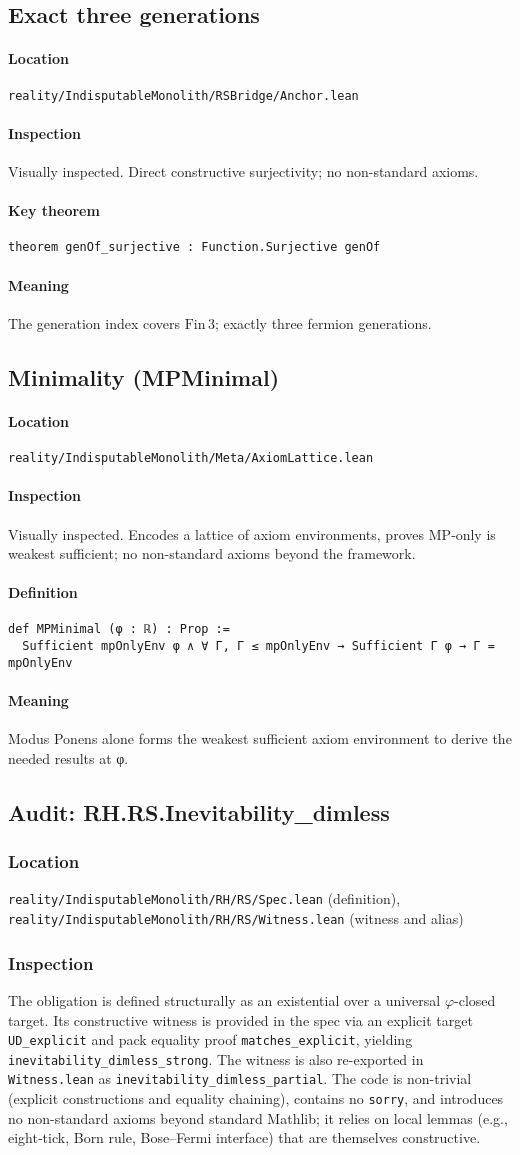 \documentclass{article}
\newcommand{\FileRef}[1]{\texttt{#1}}
\newcommand{\ModuleHeader}[3]{%
  \subsection{#1}
  \paragraph{Location} \FileRef{#2}\\
  \paragraph{Inspection} #3
}
\begin{document}
\ModuleHeader{Exact three generations}{reality/IndisputableMonolith/RSBridge/Anchor.lean}{Visually inspected. Direct constructive surjectivity; no non-standard axioms.}
\paragraph{Key theorem}
\begin{lstlisting}
theorem genOf_surjective : Function.Surjective genOf
\end{lstlisting}
\paragraph{Meaning} The generation index covers \(\mathrm{Fin}\,3\); exactly three fermion generations.

\ModuleHeader{Minimality (MPMinimal)}{reality/IndisputableMonolith/Meta/AxiomLattice.lean}{Visually inspected. Encodes a lattice of axiom environments, proves MP‑only is weakest sufficient; no non-standard axioms beyond the framework.}
\paragraph{Definition}
\begin{lstlisting}
def MPMinimal (φ : ℝ) : Prop :=
  Sufficient mpOnlyEnv φ ∧ ∀ Γ, Γ ≤ mpOnlyEnv → Sufficient Γ φ → Γ = mpOnlyEnv
\end{lstlisting}
\paragraph{Meaning} Modus Ponens alone forms the weakest sufficient axiom environment to derive the needed results at φ.


\subsection{Audit: RH.RS.Inevitability\_dimless}
\subsubsection{Location}
\FileRef{reality/IndisputableMonolith/RH/RS/Spec.lean} (definition),\\
\FileRef{reality/IndisputableMonolith/RH/RS/Witness.lean} (witness and alias)

\subsubsection{Inspection}
The obligation is defined structurally as an existential over a universal \(\varphi\)-closed target. Its constructive witness is provided in the spec via an explicit target \texttt{UD\_explicit} and pack equality proof \texttt{matches\_explicit}, yielding \texttt{inevitability\_dimless\_strong}. The witness is also re-exported in \texttt{Witness.lean} as \texttt{inevitability\_dimless\_partial}. The code is non-trivial (explicit constructions and equality chaining), contains no \texttt{sorry}, and introduces no non-standard axioms beyond standard Mathlib; it relies on local lemmas (e.g., eight‑tick, Born rule, Bose–Fermi interface) that are themselves constructive.
\end{document}
